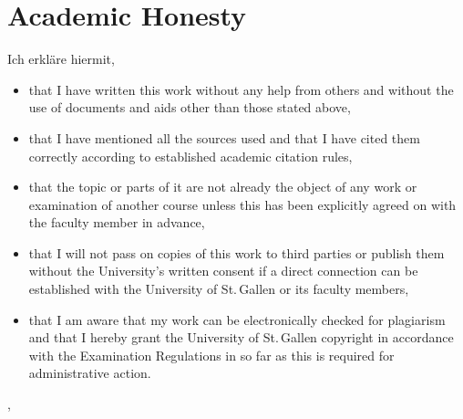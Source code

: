 \section*{Academic Honesty}
Ich erkl\"are hiermit,
\begin{itemize}
\item that I have written this work without any help from others and without the use of documents and aids other than those stated above,
\item that I have mentioned all the sources used and that I have cited them correctly according to established academic citation rules,
\item that the topic or parts of it are not already the object of any work or examination of another course unless this has been explicitly agreed on with the faculty member in advance,
\item that I will not pass on copies of this work to third parties or publish them without the University’s written consent if a direct connection can be established with the University of St.\,Gallen or its faculty members,
\item that I am aware that my work can be electronically checked for plagiarism and that I hereby grant the University of St.\,Gallen copyright in accordance with the Examination Regulations in so far as this is required for administrative action.
\end{itemize}
\vspace{1cm}
\hfill \theCity, \theDate
\\ 
\vspace{1.5cm}


\hfill \theAuthor
\thispagestyle{empty}